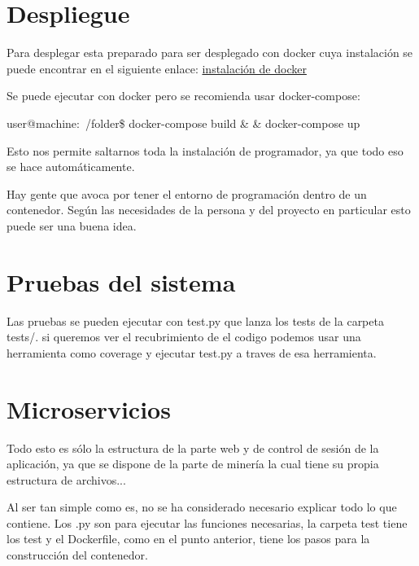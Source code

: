 \section{Despliegue}

Para desplegar esta preparado para ser desplegado con docker cuya instalación se puede encontrar en el siguiente enlace:  \href{https://docs.docker.com/engine/installation}{instalación de docker} 
	

Se puede ejecutar con docker pero se recomienda usar docker-compose:

user@machine:~/folder\$ docker-compose build \& \& docker-compose up 

Esto nos permite saltarnos toda la instalación de programador, ya que todo eso se hace automáticamente.

Hay gente que avoca por tener el entorno de programación dentro de un contenedor. Según las necesidades de la persona y del proyecto en particular esto puede ser una buena idea. 


\section{Pruebas del sistema}

Las pruebas se pueden ejecutar con test.py que lanza los tests de la carpeta tests/. si queremos ver el recubrimiento de el codigo podemos usar una herramienta como coverage y ejecutar test.py a traves de esa herramienta.  


\section{Microservicios}

Todo esto es sólo la estructura de la parte web y de control de sesión de la aplicación, ya que se dispone de la parte de minería la cual tiene su propia estructura de archivos...

Al ser tan simple como es, no se ha considerado necesario explicar todo lo que contiene. Los .py son  para ejecutar las funciones necesarias, la carpeta test tiene los test y el Dockerfile, como en el punto anterior, tiene los pasos para la construcción del contenedor.
